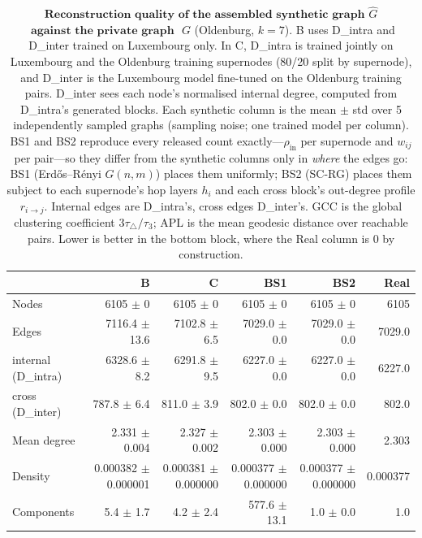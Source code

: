 \begin{table}[H]
\centering
\caption{$\textbf{Reconstruction quality of the assembled synthetic graph}$
$\widehat{G}$ $\textbf{ against the private graph }$ $G$ (Oldenburg, $k{=}7$).
B uses D\_intra and D\_inter trained on Luxembourg only. In C, D\_intra is trained jointly on Luxembourg and the Oldenburg training supernodes (80/20 split by supernode), and D\_inter is the Luxembourg model fine-tuned on the Oldenburg training pairs. D\_inter sees each node's normalised internal degree, computed from D\_intra's generated blocks. Each synthetic column is the
mean $\pm$ std over 5 independently sampled graphs (sampling noise; one trained
model per column). BS1 and BS2 reproduce every released count exactly---$\rho_{\mathrm{in}}$
per supernode and $w_{ij}$ per pair---so they differ from the synthetic columns
only in \emph{where} the edges go: BS1 (Erd\H{o}s--R\'enyi $G(n,m)$) places them
uniformly; BS2 (SC-RG) places them subject to each supernode's hop layers $h_i$ and
each cross block's out-degree profile $r_{i\to j}$. Internal edges are D\_intra's, cross edges
D\_inter's. GCC is the global clustering coefficient $3\tau_{\triangle}/\tau_{3}$;
APL is the mean geodesic distance over reachable pairs. Lower is better in the
bottom block, where the Real column is $0$ by construction.}
\label{tab:lsyn-oldenburg-k7}
\begin{tabular}{lrrrrr}
\toprule
 & B & C & BS1 & BS2 & Real \\
\midrule
Nodes                         & 6105 $\pm$ 0 & 6105 $\pm$ 0 & 6105 $\pm$ 0 & 6105 $\pm$ 0 & 6105 \\
Edges                         & 7116.4 $\pm$ 13.6 & 7102.8 $\pm$ 6.5 & 7029.0 $\pm$ 0.0 & 7029.0 $\pm$ 0.0 & 7029.0 \\
\quad internal (D\_intra)     & 6328.6 $\pm$ 8.2 & 6291.8 $\pm$ 9.5 & 6227.0 $\pm$ 0.0 & 6227.0 $\pm$ 0.0 & 6227.0 \\
\quad cross (D\_inter)        & 787.8 $\pm$ 6.4 & 811.0 $\pm$ 3.9 & 802.0 $\pm$ 0.0 & 802.0 $\pm$ 0.0 & 802.0 \\
Mean degree                   & 2.331 $\pm$ 0.004 & 2.327 $\pm$ 0.002 & 2.303 $\pm$ 0.000 & 2.303 $\pm$ 0.000 & 2.303 \\
Density                       & 0.000382 $\pm$ 0.000001 & 0.000381 $\pm$ 0.000000 & 0.000377 $\pm$ 0.000000 & 0.000377 $\pm$ 0.000000 & 0.000377 \\
Components                    & 5.4 $\pm$ 1.7 & 4.2 $\pm$ 2.4 & 577.6 $\pm$ 13.1 & 1.0 $\pm$ 0.0 & 1.0 \\

\end{tabular}
\end{table}
